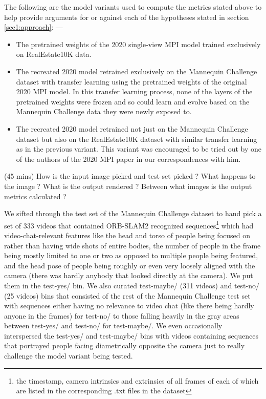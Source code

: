 The following are the model variants used to compute the metrics stated above to help provide arguments for or against each of the hypotheses stated in section \ref{sec1:approach}: ---
\begin{itemize}
    \item The pretrained weights of the 2020 single-view MPI model trained exclusively on RealEstate10K data.
    \item The recreated 2020 model retrained exclusively on the Mannequin Challenge dataset with transfer learning using the pretrained weights of the original 2020 MPI model. In this transfer learning process, none of the layers of the pretrained weights were frozen and so could learn and evolve based on the Mannequin Challenge data they were newly exposed to.
    \item The recreated 2020 model retrained not just on the Mannequin Challenge dataset but also on the RealEstate10K dataset with similar transfer learning as in the previous variant. This variant was encouraged to be tried out by one of the authors of the 2020 MPI paper in our correspondences with him. \cite{single_view_mpi}
\end{itemize}



(45 mins) 
How is the input image picked and test set picked ?
What happens to the image ? 
What is the output rendered ? 
Between what images is the output metrics calculated ? 

We sifted through the test set of the Mannequin Challenge dataset to hand pick a set of 333 videos that contained ORB-SLAM2 recognized sequences\footnote{the timestamp, camera intrinsics and extrinsics of all frames of each of which are listed in the corresponding .txt files in the dataset} which had video-chat-relevant features like the head and torso of people being focused on rather than having wide shots of entire bodies, the number of people in the frame being mostly limited to one or two as opposed to multiple people being featured, and the head pose of people being roughly or even very loosely aligned with the camera (there was hardly anybody that looked directly at the camera). We put them in the test-yes/ bin. We also curated test-maybe/ (311 videos) and test-no/ (25 videos) bins that consisted of the rest of the Mannequin Challenge test set with sequences either having no relevance to video chat (like there being hardly anyone in the frames) for test-no/ to those falling heavily in the gray areas between test-yes/ and test-no/ for test-maybe/. We even occasionally interspersed the test-yes/ and test-maybe/ bins with videos containing sequences that portrayed people facing diametrically opposite the camera just to really challenge the model variant being tested.

